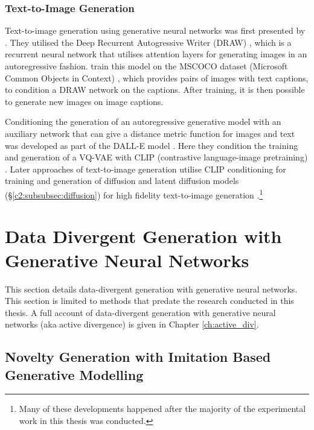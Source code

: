 \subsubsection{Text-to-Image Generation}

Text-to-image generation using generative neural networks was first presented by \cite{mansimov2015generating}.
They utilised the Deep Recurrent Autogressive Writer (DRAW) \citep{gregor2015draw}, which is a recurrent neural network that utilises attention layers for generating images in an autoregressive fashion.
\cite{mansimov2015generating} train this model on the MSCOCO dataset (Microsoft Common Objects in Context) \citep{lin2014microsoft}, which provides pairs of images with text captions, to condition a DRAW network on the captions.
After training, it is then possible to generate new images on image captions.

Conditioning the generation of an autoregressive generative model with an auxiliary network that can give a distance metric function for images and text was developed as part of the DALL-E model \citep{ramesh2021zero}.
Here they condition the training and generation of a VQ-VAE \citep{razavi2019generating} with CLIP (contrastive language-image pretraining) \citep{radford2021learning}.
Later approaches of text-to-image generation utilise CLIP conditioning for training and generation of diffusion and latent diffusion models (\S \ref{c2:subsubsec:diffusion}) for high fidelity text-to-image generation \citep{rombach2022high}.\footnote{Many of these developments happened after the majority of the experimental work in this thesis was conducted.}


\section{Data Divergent Generation with Generative Neural Networks}
\label{c2:sec:data-divergent}

This section details data-divergent generation with generative neural networks. 
This section is limited to methods that predate the research conducted in this thesis.
A full account of data-divergent generation with generative neural networks (aka active divergence) is given in Chapter \ref{ch:active_div}.

\subsection{Novelty Generation with Imitation Based Generative Modelling}

